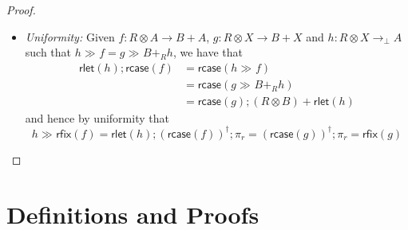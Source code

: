 \documentclass[acmsmall,screen,review]{acmart}
\newcommand{\ms}[1]{\ensuremath{\mathsf{#1}}}
\newcommand{\dmor}[1]{{\Delta}_{#1}}
\newcommand{\rlmor}[1]{\ms{rlet}(#1)}
\newcommand{\rcase}[1]{\ms{rcase}(#1)}
\newcommand{\rfix}[1]{\ms{rfix}(#1)}
\newcommand{\rseq}[3]{#2 \gg_{#1} #3}
\begin{document}
\begin{proof}
\begin{itemize}
    By uniformity, it therefore suffices to show that
    \begin{equation}
      \begin{aligned}
        & (\dmor{R} \otimes A ; \alpha )
          ; (
            R \otimes (\rcase{f} ; \pi_r + R \otimes A) ; \delta^{-1} 
              ; (\delta^{-1} ; (\pi_r + R \otimes A)) + R \otimes (R \otimes A)
          ) \\
        & = \dmor{R} \otimes A ; \alpha
          ; R \otimes (\dmor{R} \otimes A ; \alpha ; R \otimes f ; \delta^{-1} 
            ; \pi_r + R \otimes A) 
          ; \delta^{-1} ; (\delta^{-1} ; (\pi_r + R \otimes A)) + R \otimes (R \otimes A) \\
        & = \dmor{R} \otimes A ; \alpha
          ; R \otimes (\dmor{R} \otimes A ; \alpha ; R \otimes f ; \delta^{-1}) ; \\ & \qquad 
            \delta^{-1} ; R \otimes \pi_r + R \otimes (R \otimes A) 
          ; (\delta^{-1} ; (\pi_r + R \otimes A)) + R \otimes (R \otimes A) \\
        & = \dmor{R} \otimes A ; \alpha
          ; R \otimes f
          ; \delta^{-1}
          ; \delta^{-1} + (R \otimes A)
          ; (\pi_r + R \otimes A) + (\dmor{R} \otimes A ; \alpha)
      \end{aligned}
    \end{equation}
    to obtain the desired result.
    \item \emph{Uniformity:} 
    Given $f : R \otimes A \to B + A$, $g : R \otimes X \to B + X$ and $h : R \otimes X \to_\bot A$
    such that $\rseq{}{h}{f} = \rseq{}{g}{B +_R h}$, we have that
    \begin{equation}
      \begin{aligned}
      \rlmor{h} ; \rcase{f} 
      & = \rcase{\rseq{}{h}{f}} \\
      & = \rcase{\rseq{}{g}{B +_R h}} \\ 
      & = \rcase{g} ; (R \otimes B) + \rlmor{h}        
      \end{aligned}
    \end{equation}
    and hence by uniformity that
    \begin{equation}
      \rseq{}{h}{\rfix{f}} 
      = \rlmor{h} ; (\rcase{f})^\dagger ; \pi_r
      = (\rcase{g})^\dagger ; \pi_r 
      = \rfix{g}
    \end{equation}
  \end{itemize}
\end{proof}

\section{Definitions and Proofs}
\end{document}
